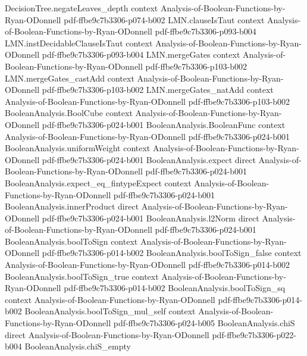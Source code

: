 \begin{theorem}
\proofstep
  {DecisionTree.negateLeaves_depth}
  {context}
  {Analysis-of-Boolean-Functions-by-Ryan-ODonnell}
  {pdf-ffbe9c7b3306-p074-b002}
\proofstep
  {LMN.clauseIsTaut}
  {context}
  {Analysis-of-Boolean-Functions-by-Ryan-ODonnell}
  {pdf-ffbe9c7b3306-p093-b004}
\proofstep
  {LMN.instDecidableClauseIsTaut}
  {context}
  {Analysis-of-Boolean-Functions-by-Ryan-ODonnell}
  {pdf-ffbe9c7b3306-p093-b004}
\proofstep
  {LMN.mergeGates}
  {context}
  {Analysis-of-Boolean-Functions-by-Ryan-ODonnell}
  {pdf-ffbe9c7b3306-p103-b002}
\proofstep
  {LMN.mergeGates_castAdd}
  {context}
  {Analysis-of-Boolean-Functions-by-Ryan-ODonnell}
  {pdf-ffbe9c7b3306-p103-b002}
\proofstep
  {LMN.mergeGates_natAdd}
  {context}
  {Analysis-of-Boolean-Functions-by-Ryan-ODonnell}
  {pdf-ffbe9c7b3306-p103-b002}
\proofstep
  {BooleanAnalysis.BoolCube}
  {context}
  {Analysis-of-Boolean-Functions-by-Ryan-ODonnell}
  {pdf-ffbe9c7b3306-p024-b001}
\proofstep
  {BooleanAnalysis.BooleanFunc}
  {context}
  {Analysis-of-Boolean-Functions-by-Ryan-ODonnell}
  {pdf-ffbe9c7b3306-p024-b001}
\proofstep
  {BooleanAnalysis.uniformWeight}
  {context}
  {Analysis-of-Boolean-Functions-by-Ryan-ODonnell}
  {pdf-ffbe9c7b3306-p024-b001}
\proofstep
  {BooleanAnalysis.expect}
  {direct}
  {Analysis-of-Boolean-Functions-by-Ryan-ODonnell}
  {pdf-ffbe9c7b3306-p024-b001}
\proofstep
  {BooleanAnalysis.expect_eq_fintypeExpect}
  {context}
  {Analysis-of-Boolean-Functions-by-Ryan-ODonnell}
  {pdf-ffbe9c7b3306-p024-b001}
\proofstep
  {BooleanAnalysis.innerProduct}
  {direct}
  {Analysis-of-Boolean-Functions-by-Ryan-ODonnell}
  {pdf-ffbe9c7b3306-p024-b001}
\proofstep
  {BooleanAnalysis.l2Norm}
  {direct}
  {Analysis-of-Boolean-Functions-by-Ryan-ODonnell}
  {pdf-ffbe9c7b3306-p024-b001}
\proofstep
  {BooleanAnalysis.boolToSign}
  {context}
  {Analysis-of-Boolean-Functions-by-Ryan-ODonnell}
  {pdf-ffbe9c7b3306-p014-b002}
\proofstep
  {BooleanAnalysis.boolToSign_false}
  {context}
  {Analysis-of-Boolean-Functions-by-Ryan-ODonnell}
  {pdf-ffbe9c7b3306-p014-b002}
\proofstep
  {BooleanAnalysis.boolToSign_true}
  {context}
  {Analysis-of-Boolean-Functions-by-Ryan-ODonnell}
  {pdf-ffbe9c7b3306-p014-b002}
\proofstep
  {BooleanAnalysis.boolToSign_sq}
  {context}
  {Analysis-of-Boolean-Functions-by-Ryan-ODonnell}
  {pdf-ffbe9c7b3306-p014-b002}
\proofstep
  {BooleanAnalysis.boolToSign_mul_self}
  {context}
  {Analysis-of-Boolean-Functions-by-Ryan-ODonnell}
  {pdf-ffbe9c7b3306-p024-b005}
\proofstep
  {BooleanAnalysis.chiS}
  {direct}
  {Analysis-of-Boolean-Functions-by-Ryan-ODonnell}
  {pdf-ffbe9c7b3306-p022-b004}
\proofstep
  {BooleanAnalysis.chiS_empty}

\end{theorem}
